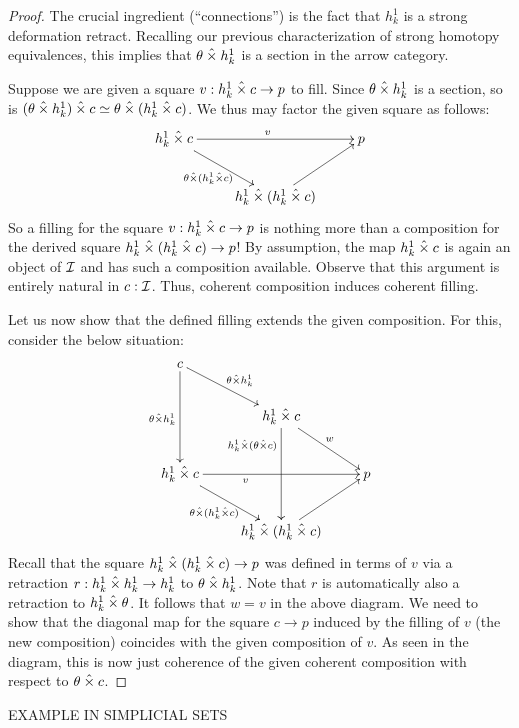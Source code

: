 \documentclass[reqno,10pt,a4paper,oneside]{amsart}
\begin{document}
\begin{proof}
The crucial ingredient (``connections'') is the fact that $h_k^1$ is a strong deformation retract.
Recalling our previous characterization of strong homotopy equivalences, this implies that $\theta \hattimes h_k^1$ is a section in the arrow category.

Suppose we are given a square $v : h_k^1 \hattimes c \to p$ to fill.
Since $\theta \hattimes h_k^1$ is a section, so is $(\theta \hattimes h_k^1) \hattimes c \simeq \theta \hattimes (h_k^1 \hattimes c)$.
We thus may factor the given square as follows:
\[
\xymatrix{
  h_k^1 \hattimes c
  \ar[rr]^{v}
  \ar[dr]_{\theta \hattimes (h_k^1 \hattimes c)}
&&
  p
\\&
  h_k^1 \hattimes (h_k^1 \hattimes c)
  \ar[ur]
}
\]
So a filling for the square $v : h_k^1 \hattimes c \to p$ is nothing more than a composition for the derived square $h_k^1 \hattimes (h_k^1 \hattimes c) \to p$!
By assumption, the map $h_k^1 \hattimes c$ is again an object of $\cal{I}$ and has such a composition available.
Observe that this argument is entirely natural in $c : \cal{I}$.
Thus, coherent composition induces coherent filling.

Let us now show that the defined filling extends the given composition.
For this, consider the below situation:
\[
\xymatrix{
  c
  \ar[dr]^{\theta \hattimes h_k^1}
  \ar[dd]_{\theta \hattimes h_k^1}
\\&
  h_k^1 \hattimes c
  \ar[dd]_(0.25){h_k^1 \hattimes (\theta \hattimes c)}
  \ar[dr]^{w}
\\
  h_k^1 \hattimes c
  \ar[rr]_(0.35){v}
  \ar[dr]_{\theta \hattimes (h_k^1 \hattimes c)}
&&
  p
\\&
  h_k^1 \hattimes (h_k^1 \hattimes c)
  \ar[ur]
}
\]
Recall that the square $h_k^1 \hattimes (h_k^1 \hattimes c) \to p$ was defined in terms of $v$ via a retraction $r : h_k^1 \hattimes h_k^1 \to h_k^1$ to $\theta \hattimes h_k^1$.
Note that $r$ is automatically also a retraction to $h_k^1 \hattimes \theta$.
It follows that $w = v$ in the above diagram.
We need to show that the diagonal map for the square $c \to p$ induced by the filling of $v$ (the new composition) coincides with the given composition of $v$.
As seen in the diagram, this is now just coherence of the given coherent composition with respect to $\theta \hattimes c$.
\end{proof}


EXAMPLE IN SIMPLICIAL SETS
\end{document}
